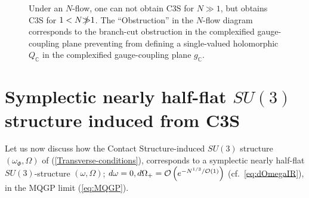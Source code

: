 \documentclass[a4paper,11pt,fleqn]{article}
\theoremstyle{plain}
\theoremstyle{definition}
\begin{document}
\begin{figure}
\caption{Under an $N$-flow, one can not obtain C3S for $N\gg1$, but obtains C3S for $1<N\slashed{\gg}1$. The ``Obstruction'' in the $N$-flow diagram corresponds to the
branch-cut obstruction in the complexified gauge-coupling plane preventing from defining a single-valued holomorphic $Q_{\mathbb{C}}$ in the complexified gauge-coupling plane $g_{\mathbb{C}}$.
}
\end{figure}




\section{Symplectic nearly half-flat $SU(3)$ structure induced from C3S}

Let us now discuss how the Contact Structure-induced $SU(3)$ structure $\left(\omega_\Phi,\Omega\right)$ of (\ref{Transverse-conditions}), corresponds to a symplectic nearly half-flat $SU(3)$-structure $(\omega, \Omega)$; $d\omega=0, d\Omega_+={\cal O}\left(e^{-N^{1/3}/{\cal O}(1)}\right)$ (cf.\ \eqref{eq:dOmegaIR}), in the MQGP limit (\ref{eq:MQGP}).
\end{document}
